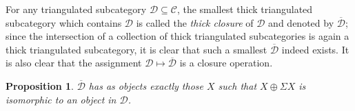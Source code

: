 \documentclass{amsproc}
\newtheorem{prop}{Proposition}[section]
\theoremstyle{definition}
\begin{document}
For any triangulated subcategory ${\mathcal{D}}\subseteq{\mathcal{C}}$, the smallest thick triangulated subcategory which contains ${\mathcal{D}}$ is called the \emph{thick closure} of ${\mathcal{D}}$ and denoted by $\overline{\mathcal{D}}$; since the intersection of a collection of thick triangulated subcategories is again a thick triangulated subcategory, it is clear that such a smallest $\overline{\mathcal{D}}$ indeed exists. It is also clear that the assignment ${\mathcal{D}}\mapsto\overline{\mathcal{D}}$ is a closure operation.

\begin{prop}
\label{thickclosure}
$\overline{\mathcal{D}}$ has as objects exactly those $X$ such that $X\oplus\Sigma X$ is isomorphic to an object in ${\mathcal{D}}$.
\end{prop}
\end{document}
